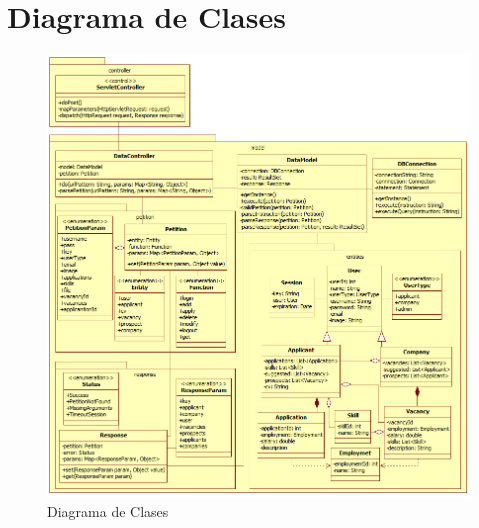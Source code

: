 \newpage
\section{Diagrama de Clases}

\begin{figure}[h]
\begin{center}
	\includegraphics[scale=0.73]{./resources/ClassDiagram.png}
	\caption{Diagrama de Clases}
	\label{fig:classdiagram}
\end{center}
\end{figure}